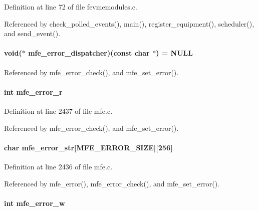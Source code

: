 Definition at line 72 of file fevmemodules.c.

Referenced by check\_\-polled\_\-events(), main(), register\_\-equipment(), scheduler(), and send\_\-event().
\paragraph[{mfe\_\-error\_\-dispatcher}]{\setlength{\rightskip}{0pt plus 5cm}void($\ast$ {\bf mfe\_\-error\_\-dispatcher})(const char $\ast$) = NULL}\hfill\label{mfe_8c_af913cd8ed4c73ffcd762ead3c3c4426b}


Referenced by mfe\_\-error\_\-check(), and mfe\_\-set\_\-error().
\paragraph[{mfe\_\-error\_\-r}]{\setlength{\rightskip}{0pt plus 5cm}int {\bf mfe\_\-error\_\-r}}\hfill\label{mfe_8c_a6aa654734441af88ec5dea1877701e49}


Definition at line 2437 of file mfe.c.

Referenced by mfe\_\-error\_\-check(), and mfe\_\-set\_\-error().
\paragraph[{mfe\_\-error\_\-str}]{\setlength{\rightskip}{0pt plus 5cm}char {\bf mfe\_\-error\_\-str}\mbox{[}MFE\_\-ERROR\_\-SIZE\mbox{]}\mbox{[}256\mbox{]}}\hfill\label{mfe_8c_ac94b7f26a74ade71dcc2754df3092a6f}


Definition at line 2436 of file mfe.c.

Referenced by mfe\_\-error(), mfe\_\-error\_\-check(), and mfe\_\-set\_\-error().
\paragraph[{mfe\_\-error\_\-w}]{\setlength{\rightskip}{0pt plus 5cm}int {\bf mfe\_\-error\_\-w}}\hfill\label{mfe_8c_a11d9abe61d69ba03a99f62abadb0c6ad}


